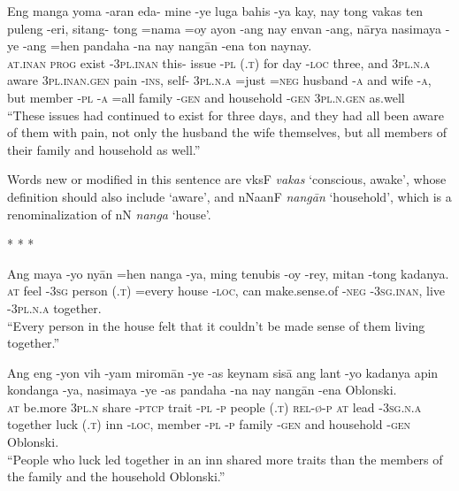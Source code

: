 \documentclass[12pt,paper=letter]{scrartcl}
\newcommand{\fw}[1]{\textit{#1}} %
\newcommand{\q}[1]{\enquote{#1}} %
\newcommand{\qq}[1]{\enquote*{#1}} %
\newcommand{\divider}{\vspace{0.5\baselineskip} \centerline{* * *} \vspace{0.5\baselineskip}}
\newcommand{\mor}[1]{\textsc{\lowercase{#1}}}
\newcommand{\ayr}[1]{{\Tagati #1}}
\begin{document}
\begin{exe}  %
    \ex \gll Eng manga yoma -aran eda- mine -ye {} luga bahis -ya kay, nay tong 
	vakas ten puleng -eri, sitang- tong =nama =oy ayon -ang nay envan -ang, 
	nārya nasimaya -ye -ang =hen pandaha -na nay nangān -ena ton naynay. \\
    \mor{AT.INAN} \mor{PROG} exist \mor{-3PL.INAN} this- issue \mor{-PL} 
	\mor{(.T)} for day \mor{-LOC} three, and \mor{3PL.N.A} aware 
	\mor{3PL.INAN.GEN} pain \mor{-INS}, self- \mor{3PL.N.A} =just \mor{=NEG}
	husband \mor{-A} and wife \mor{-A}, but member \mor{-PL} \mor{-A} 
	=all family \mor{-GEN} and household \mor{-GEN} \mor{3PL.N.GEN} as.well \\
    \glt \q{These issues had continued to exist for three days, and they had 
	all been aware of them with pain, not only the husband the wife 
	themselves, but all members of their family and household as well.}
\end{exe}

Words new or modified in this sentence are \ayr{vksF} \fw{vakas} \qq{conscious,
awake}, whose definition should also include \qq{aware}, and \ayr{nNaanF}
\fw{nangān} \qq{household}, which is a renominalization of \ayr{nN} \fw{nanga}
\qq{house}.

\divider

\begin{exe}  %
    \ex
    \begin{xlist}
	\ex \label{ex:5a}
	\gll Ang maya -yo nyān {} =hen nanga -ya, ming tenubis -oy -rey, 
	    mitan -tong kadanya. \\
	\mor{AT} feel \mor{-3SG} person \mor{(.T)} =every house \mor{-LOC}, can 
	    make.sense.of \mor{-NEG} \mor{-3SG.INAN}, live \mor{-3PL.N.A} 
	    together.\\
	\glt \q{Every person in the house felt that it couldn't be made sense 
	    of them living together.}
	
	\ex \label{ex:5b}
	\gll Ang eng -yon vih -yam miromān -ye -as keynam {} sisā ang lant 
	    -yo kadanya apin {} kondanga -ya, nasimaya -ye -as pandaha -na nay 
	    nangān -ena Oblonski. \\
	\mor{AT} be.more \mor{3PL.N} share \mor{-PTCP} trait \mor{-PL} \mor{-P} 
	    people \mor{(.T)} \mor{REL-Ø-P} \mor{AT} lead \mor{-3SG.N.A} 
	    together luck \mor{(.T)} inn \mor{-LOC}, member \mor{-PL} \mor{-P} 
	    family \mor{-GEN} and household \mor{-GEN} Oblonski. \\
	\glt \q{People who luck led together in an inn shared more traits than 
	    the members of the family and the household Oblonski.}
    \end{xlist}
\end{exe}
\end{document}
